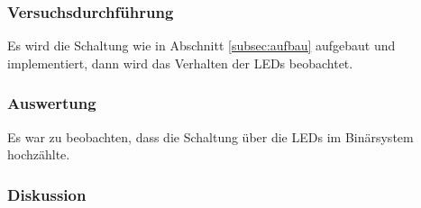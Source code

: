 \documentclass[12pt,a4paper]{article}
\begin{document}
\subsubsection*{Versuchsdurchführung}

Es wird die Schaltung wie in Abschnitt \ref{subsec:aufbau} aufgebaut und implementiert, dann wird das Verhalten der LEDs beobachtet.

\subsubsection*{Auswertung}

Es war zu beobachten, dass die Schaltung über die LEDs im Binärsystem hochzählte.

\subsubsection*{Diskussion}
\end{document}
